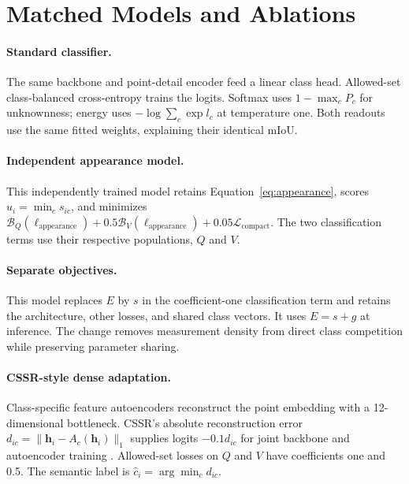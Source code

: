 \documentclass{article}
\begin{document}
\section{Matched Models and Ablations}
\label{app:controls}
\paragraph{Standard classifier.}
The same backbone and point-detail encoder feed a linear class head. Allowed-set class-balanced cross-entropy trains the logits. Softmax uses $1-\max_cP_c$ for unknownness; energy uses $-\log\sum_c\exp l_c$ at temperature one. Both readouts use the same fitted weights, explaining their identical mIoU.

\paragraph{Independent appearance model.}
This independently trained model retains Equation~\eqref{eq:appearance}, scores $u_i=\min_c s_{ic}$, and minimizes $\mathcal B_Q(\ell_{\mathrm{appearance}})+0.5\mathcal B_V(\ell_{\mathrm{appearance}})+0.05\mathcal L_{\mathrm{compact}}$. The two classification terms use their respective populations, $Q$ and $V$.

\paragraph{Separate objectives.}
This model replaces $E$ by $s$ in the coefficient-one classification term and retains the architecture, other losses, and shared class vectors. It uses $E=s+g$ at inference. The change removes measurement density from direct class competition while preserving parameter sharing.

\paragraph{CSSR-style dense adaptation.}
Class-specific feature autoencoders reconstruct the point embedding with a 12-dimensional bottleneck. CSSR's absolute reconstruction error $d_{ic}=\|\mathbf h_i-A_c(\mathbf h_i)\|_1$ supplies logits $-0.1d_{ic}$ for joint backbone and autoencoder training \citep{cssr}. Allowed-set losses on $Q$ and $V$ have coefficients one and 0.5. The semantic label is $\hat c_i=\arg\min_c d_{ic}$.
\end{document}
